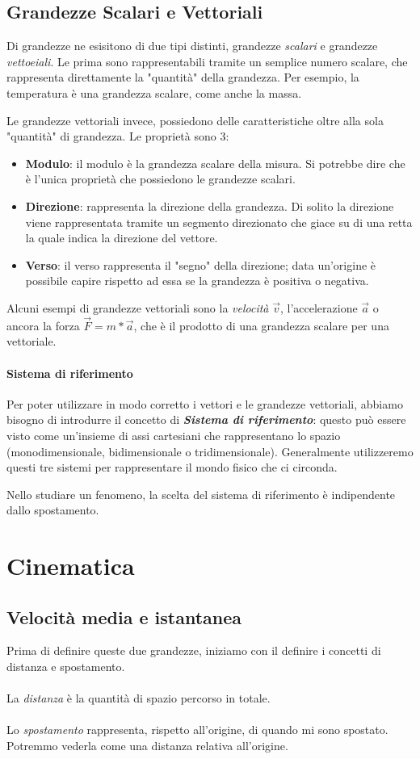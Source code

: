 \documentclass[11pt]{article}
\begin{document}
\subsection{Grandezze Scalari e Vettoriali}
Di grandezze ne esisitono di due tipi distinti, grandezze \textit{scalari} e grandezze \textit{vettoeiali}. Le prima sono rappresentabili tramite un semplice numero scalare, che rappresenta direttamente la "quantità" della grandezza. Per esempio, la temperatura è una grandezza scalare, come anche la massa.

Le grandezze vettoriali invece, possiedono delle caratteristiche oltre alla sola "quantità" di grandezza. Le proprietà sono 3:
\begin{itemize}
	\item \textbf{Modulo}: il modulo è la grandezza scalare della misura. Si potrebbe dire che è l'unica proprietà che possiedono le grandezze scalari.
	\item \textbf{Direzione}: rappresenta la direzione della grandezza. Di solito la direzione viene rappresentata tramite un segmento direzionato che giace su di una retta la quale indica la direzione del vettore.
	\item \textbf{Verso}: il verso rappresenta il "segno" della direzione; data un'origine è possibile capire rispetto ad essa se la grandezza è positiva o negativa.
\end{itemize}
Alcuni esempi di grandezze vettoriali sono la \textit{velocità} $\overrightarrow{v}$, l'accelerazione $\overrightarrow{a}$ o ancora la forza $\overrightarrow{F} = m*\overrightarrow{a}$, che è il prodotto di una grandezza scalare per una vettoriale.
\paragraph{Sistema di riferimento} Per poter utilizzare in modo corretto i vettori e le grandezze vettoriali, abbiamo bisogno di introdurre il concetto di \textit{\textbf{Sistema di riferimento}}: questo può essere visto come un'insieme di assi cartesiani che rappresentano lo spazio (monodimensionale, bidimensionale o tridimensionale). Generalmente utilizzeremo questi tre sistemi per rappresentare il mondo fisico che ci circonda.


Nello studiare un fenomeno, la scelta del sistema di riferimento è indipendente dallo spostamento.
\section{Cinematica}
\subsection{Velocità media e istantanea}
Prima di definire queste due grandezze, iniziamo con il definire i concetti di \color{red} distanza \color{black} e \color{red} spostamento\color{black}.
\\ \\
La \textit{distanza} è la quantità di spazio percorso in totale.
\\ \\
Lo \textit{spostamento} rappresenta, rispetto all'origine, di quando mi sono spostato. Potremmo vederla come una distanza relativa all'origine.
\end{document}
